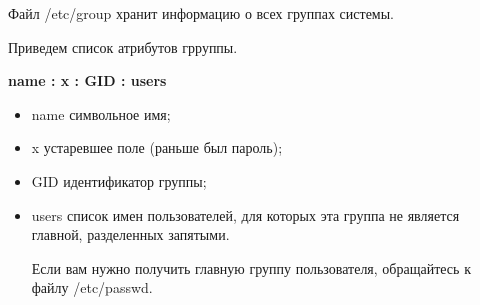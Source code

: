 Файл /etc/group хранит информацию о всех группах системы.
	
Приведем список атрибутов грруппы.

\textbf{name : x : GID : users}

\begin{itemize}

\item \begin{defi}{name}
		символьное имя;
		\end{defi}

\item \begin{defi}{x}
		устаревшее поле (раньше был пароль);
		\end{defi}

\item \begin{defi}{GID}
		идентификатор группы;
		\end{defi}

\item \begin{defi}{users}
		список имен пользователей, для которых эта группа не является главной, разделенных запятыми.

		\begin{important}
		Если вам нужно получить главную группу пользователя, обращайтесь к файлу /etc/passwd.
		\end{important}
		\end{defi}

\end{itemize}
